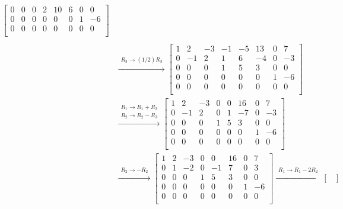 \documentclass{article}
\begin{document}
\begin{itemize}
\begin{align*}
\begin{bmatrix}
0 &  0 &  0 &  2 & 10 &   6 & 0 &  0 \\
0 &  0 &  0 &  0 &   0 &   0 & 1 & -6 \\ 
0 &  0 &  0 &  0 &   0 &   0 & 0 &  0 \\
\end{bmatrix} \\ \\ 
& \xrightarrow{\begin{array}{c} R_3 \rightarrow (1/2)R_3 \end{array}} \begin{bmatrix}
1 &  2 & -3 & -1 & -5 & 13 & 0 &  7 \\
0 & -1 &  2 &  1 &   6 & -4 & 0 & -3 \\
0 &  0 &  0 &  1 &   5 &   3 & 0 &  0 \\
0 &  0 &  0 &  0 &   0 &   0 & 1 & -6 \\ 
0 &  0 &  0 &  0 &   0 &   0 & 0 &  0 \\
\end{bmatrix} \\
& \xrightarrow{\begin{array}{c} R_1 \rightarrow R_1 + R_3 \\ R_2 \rightarrow R_2 - R_3 \end{array}} \begin{bmatrix}
1 &  2 & -3 & 0 & 0 & 16 & 0 &  7 \\
0 & -1 &  2 & 0 & 1 & -7 & 0 & -3 \\
0 &  0 &  0 & 1 & 5 &   3 & 0 &  0 \\
0 &  0 &  0 & 0 & 0 &   0 & 1 & -6 \\ 
0 &  0 &  0 & 0 & 0 &   0 & 0 &  0 \\
\end{bmatrix} \\ 
& \xrightarrow{\begin{array}{c} R_2 \rightarrow -R_2 \end{array}} \begin{bmatrix}
1 & 2 & -3 & 0 &  0 & 16 & 0 &  7 \\
0 & 1 & -2 & 0 & -1 &  7 & 0 &  3 \\
0 & 0 &  0 & 1 &  5 &   3 & 0 &  0 \\
0 & 0 &  0 & 0 &  0 &   0 & 1 & -6 \\ 
0 & 0 &  0 & 0 &  0 &   0 & 0 &  0 \\
\end{bmatrix} \xrightarrow{\begin{array}{c} R_1 \rightarrow R_1 - 2R_2 \end{array}} \begin{bmatrix}

\end{bmatrix}
\end{align*}
\end{itemize}
\end{document}
